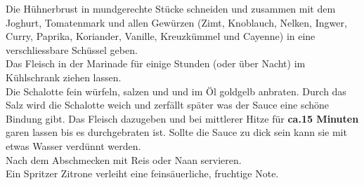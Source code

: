 \vspace*{\fill}
\begin{multicols}{2}

Die Hühnerbrust in mundgerechte Stücke schneiden und zusammen mit dem Joghurt, Tomatenmark und allen Gewürzen 
(Zimt, Knoblauch, Nelken, Ingwer, Curry, Paprika, Koriander, Vanille, Kreuzkümmel und Cayenne) in eine verschliessbare 
Schüssel geben.\\
Das Fleisch in der Marinade für einige Stunden (oder über Nacht) im Kühlschrank ziehen lassen.\\

Die Schalotte fein würfeln, salzen und und im Öl goldgelb anbraten.
Durch das Salz wird die Schalotte weich und zerfällt später was der Sauce eine schöne Bindung gibt.
Das Fleisch dazugeben und bei mittlerer Hitze für \textbf{ca.15 Minuten} garen lassen bis es durchgebraten ist. Sollte die Sauce 
zu dick sein kann sie mit etwas Wasser verdünnt werden.\\
Nach dem Abschmecken mit Reis oder Naan servieren.\\

Ein Spritzer Zitrone verleiht eine feinsäuerliche, fruchtige Note.   




\end{multicols}
\vfill
